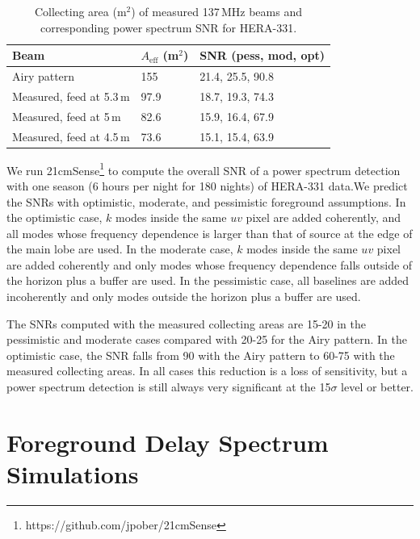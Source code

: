 \documentclass{emulateapj}
\begin{document}
 \begin{table}[h]
 \caption{ \label{table:collectingareatable}Collecting area (m$^2$) of measured 137\,MHz beams and corresponding power spectrum SNR for HERA-331.}
\begin{tabular}{| l | l | l |}
\hline
Beam & $A_\text{eff}$ (m$^2$) & SNR (pess, mod, opt)\\
\hline
  Airy pattern & 155 & 21.4, 25.5, 90.8  \\
    Measured, feed at 5.3\,m & 97.9 & 18.7, 19.3, 74.3 \\
    Measured, feed at 5\,m & 82.6 & 15.9, 16.4, 67.9 \\
    Measured, feed at 4.5\,m & 73.6 & 15.1, 15.4, 63.9 \\ 
  \hline
\end{tabular}
\end{table}

We run 21cmSense\footnote{https://github.com/jpober/21cmSense} to compute the overall SNR of a power spectrum detection with one season (6 hours per night for 180 nights) of HERA-331 data.We predict the SNRs with optimistic, moderate, and pessimistic foreground assumptions. In the optimistic case, $k$ modes inside the same $uv$ pixel are added coherently, and all modes whose frequency dependence is larger than that of source at the edge of the main lobe are used. In the moderate case, $k$ modes inside the same $uv$ pixel are added coherently and only modes whose frequency dependence falls outside of the horizon plus a buffer are used. In the pessimistic case, all baselines are added incoherently and only modes outside the horizon plus a buffer are used.

The SNRs computed with the measured collecting areas are 15-20 in the pessimistic and moderate cases compared with 20-25 for the Airy pattern. In the optimistic case, the SNR falls from 90 with the Airy pattern to 60-75 with the measured collecting areas. In all cases this reduction is a loss of sensitivity, but a power spectrum detection is still always very significant at the 15$\sigma$ level or better.

\section{Foreground Delay Spectrum Simulations}
\label{sec:foregrounds}
\end{document}
